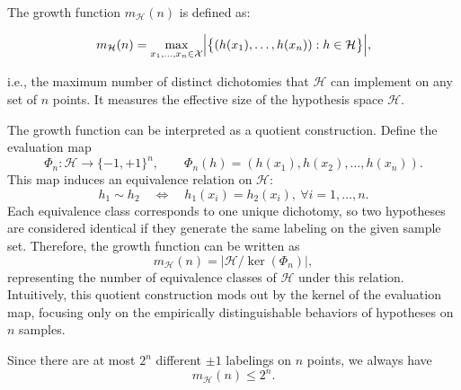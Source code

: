 \documentclass[../main]{subfiles}
\begin{document}
The growth function $m_{\mathcal{H}}(n)$ is defined as:
\begin{definition}
    \begin{equation}
        m_{\mathcal{H}}(n)
        = \max_{x_1,\dots,x_n \in \mathcal{X}}
          \Bigl|\bigl\{(h(x_1),\dots,h(x_n)) : h\in\mathcal{H}\bigr\}\Bigr|,
    \end{equation}
\end{definition}
i.e., the maximum number of distinct dichotomies that $\mathcal{H}$ can implement
on any set of $n$ points. It measures the effective size of the hypothesis space
$\mathcal{H}$.
\begin{note}
    The growth function can be interpreted as a quotient construction.  
    Define the evaluation map
    \begin{equation}
        \Phi_n : \mathcal{H} \to \{-1,+1\}^n, \qquad
        \Phi_n(h) = (h(x_1), h(x_2), \dots, h(x_n)).
    \end{equation}
    This map induces an equivalence relation on $\mathcal{H}$:
    \begin{equation}
        h_1 \sim h_2 \quad \Leftrightarrow \quad h_1(x_i) = h_2(x_i), \ \forall i = 1, \dots, n.
    \end{equation}
    Each equivalence class corresponds to one unique dichotomy,  
    so two hypotheses are considered identical if they generate the same labeling  
    on the given sample set. Therefore, the growth function can be written as
    \begin{equation}
        m_{\mathcal{H}}(n) = \bigl|\mathcal{H} / \ker(\Phi_n)\bigr|,
    \end{equation}
    representing the number of equivalence classes of $\mathcal{H}$ under this relation.  
    Intuitively, this quotient construction mods out by the kernel of the evaluation map,  
    focusing only on the empirically distinguishable behaviors of hypotheses on $n$ samples.
    \end{note}
    Since there are at most $2^n$ different $\pm1$ labelings on $n$ points, we always have
\begin{equation}
    m_{\mathcal{H}}(n) \le 2^n.
\end{equation}
\end{document}

